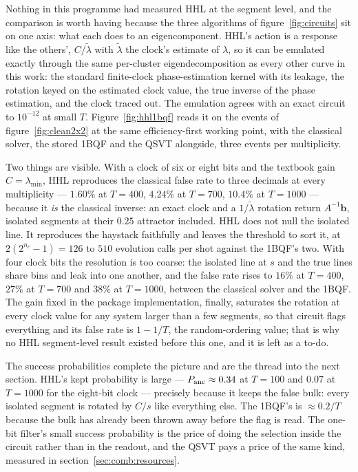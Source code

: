 \documentclass[11pt,a4paper]{article}
\begin{document}
Nothing in this programme had measured HHL at the segment level, and the
comparison is worth having because the three algorithms of
figure~\ref{fig:circuits} sit on one axis: what each does to an
eigencomponent. HHL's action is a response like the others', $C/\tilde\lambda$
with $\tilde\lambda$ the clock's estimate of $\lambda$, so it can be
emulated exactly through the same per-cluster eigendecomposition as every
other curve in this work: the standard finite-clock phase-estimation kernel
with its leakage, the rotation keyed on the estimated clock value, the true
inverse of the phase estimation, and the clock traced out. The emulation
agrees with an exact circuit to $10^{-12}$ at small $T$.
Figure~\ref{fig:hhl1bqf} reads it on the events of figure~\ref{fig:clean2x2}
at the same efficiency-first working point, with the classical solver, the
stored 1BQF and the QSVT alongside, three events per multiplicity.

Two things are visible. With a clock of six or eight bits and the textbook
gain $C=\lambda_{\min}$, HHL reproduces the classical false rate to three
decimals at every multiplicity --- $1.60\%$ at $T=400$, $4.24\%$ at
$T=700$, $10.4\%$ at $T=1000$ --- because it \emph{is} the classical
inverse: an exact clock and
a $1/\tilde\lambda$ rotation return $A^{-1}\mathbf{b}$, isolated segments at
their $0.25$ attractor included. HHL does not null the isolated line. It
reproduces the haystack faithfully and leaves the threshold to sort it, at
$2(2^{n_c}-1)=126$ to $510$ evolution calls per shot against the 1BQF's two.
With four clock bits the resolution is too coarse: the isolated line at $s$
and the true lines share bins and leak into one another, and the false rate
rises to $16\%$ at $T=400$, $27\%$ at $T=700$ and $38\%$ at $T=1000$,
between the classical solver and the 1BQF. The gain fixed in the package implementation, finally,
saturates the rotation at every clock value for any system larger than a
few segments, so that circuit flags everything and its false rate is
$1-1/T$, the random-ordering value; that is why no HHL segment-level result
existed before this one, and it is left as a to-do.

The success probabilities complete the picture and are the thread into the
next section. HHL's kept probability is large --- $P_{\rm anc}\approx0.34$
at $T=100$ and $0.07$ at $T=1000$ for the eight-bit clock --- precisely
because it keeps the false bulk: every isolated segment is rotated by $C/s$
like everything else. The 1BQF's is $\approx0.2/T$ because the bulk has
already been thrown away before the flag is read. The one-bit filter's small
success probability is the price of doing the selection inside the circuit
rather than in the readout, and the QSVT pays a price of the same kind,
measured in section~\ref{sec:comb:resources}.
\end{document}
